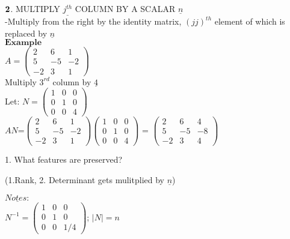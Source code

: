 \documentclass[]{article}
\begin{document}
\(\bold{2}\). MULTIPLY \(\underline{j^{th}}\) COLUMN BY A SCALAR
\(\underline{n}\)\\

-Multiply from the right by the identity matrix, \((jj)^{th}\) element
of which is replaced by \(\underline{n}\)\\

\(\mathbf{Example}\)\\

\(A =\begin{pmatrix} 2 & 6 & 1\\ 5 & -5 & -2 \\ -2 & 3 & 1 \end{pmatrix}\)\\

Multiply \(3^{rd}\) column by \(\underline{4}\)\\

Let:
\(N =\begin{pmatrix} 1 & 0 & 0\\ 0 & 1 & 0 \\ 0 & 0 & 4 \end{pmatrix}\)\\

\(AN\)=\(\begin{pmatrix} 2 & 6 & 1\\ 5 & -5 & -2 \\ -2 & 3 & 1 \end{pmatrix}\begin{pmatrix} 1 & 0 & 0\\ 0 & 1 & 0 \\ 0 & 0 & 4 \end{pmatrix}\)
=
\(\begin{pmatrix} 2 & 6 & 4\\ 5 & -5 & -8 \\ -2 & 3 & 4 \end{pmatrix}\)\\

\begin{tcolorbox}[colback=yellow!5,colframe=yellow!40!black,title=Question]
1. What features are preserved?

(1.Rank, 2. Determinant gets mulitplied by $\underline{n}$)

\end{tcolorbox}

\(\underline{Notes:}\)\\

\(N^{-1} =\begin{pmatrix} 1 & 0 & 0\\ 0 & 1 & 0 \\ 0 & 0 & 1/4 \end{pmatrix}\);
\(|N|= n\)\\
\end{document}
